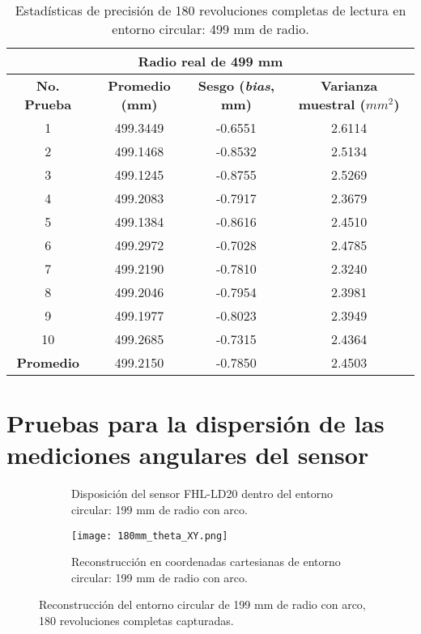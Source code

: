 \begin{table}[H]
	\centering
	\begin{tabular}{|c|c|c|c|}
		\hline
		\multicolumn{4}{|c|}{\textbf{Radio real de 499 mm}} \\ \hline
		\textbf{No. Prueba} & \textbf{Promedio (mm)} & \textbf{Sesgo (\textit{bias}, mm)} & \textbf{Varianza muestral ($mm^2$)} \\ \hline
		1 & 499.3449 & -0.6551 & 2.6114 \\ 
		2 & 499.1468 & -0.8532 & 2.5134 \\ 
		3 & 499.1245 & -0.8755 & 2.5269 \\ 
		4 & 499.2083 & -0.7917 & 2.3679 \\ 
		5 & 499.1384 & -0.8616 & 2.4510 \\ 
		6 & 499.2972 & -0.7028 & 2.4785 \\ 
		7 & 499.2190 & -0.7810 & 2.3240 \\ 
		8 & 499.2046 & -0.7954 & 2.3981 \\ 
		9 & 499.1977 & -0.8023 & 2.3949 \\ 
		10 & 499.2685 & -0.7315 & 2.4364 \\ \hline
		\textbf{Promedio} & 499.2150 & -0.7850 & 2.4503 \\ \hline
	\end{tabular}
	\caption{Estadísticas de precisión de 180 revoluciones completas de lectura en entorno circular: 499 mm de radio.}
	\label{fig:tabla_dists8}
\end{table}


\section{Pruebas para la dispersión de las mediciones angulares del sensor}
\label{dispersion_angular}
\begin{figure}[H]
	\centering
	\begin{subfigure}{0.45\textwidth}
		\centering
		\caption{Disposición del sensor FHL-LD20 dentro del entorno circular: 199 mm de radio con arco.}
		\label{fig:disposicion_lidar_theta2}
	\end{subfigure}
	\hspace{1em}
	\begin{subfigure}{0.45\textwidth}
		\centering
		\texttt{[image: 180mm\_theta\_XY.png]}
		\caption{Reconstrucción en coordenadas cartesianas de entorno circular: 199 mm de radio con arco.}
		\label{fig:199m_radius_xy_theta2}
	\end{subfigure}
	\caption{Reconstrucción del entorno circular de 199 mm de radio con arco, 180 revoluciones completas capturadas.}
	\label{fig:disposicion_lidar_var_theta2}
\end{figure}

